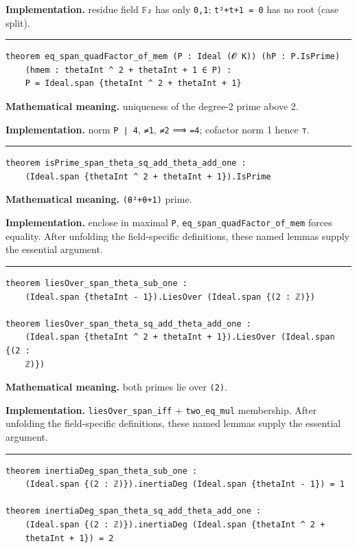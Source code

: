 \documentclass[UTF8,a4paper,11pt,fontset=fandol]{ctexart}
\theoremstyle{definition}
\newcommand{\statementsep}{\par\medskip\hrule\medskip}
\begin{document}
\noindent\textbf{Implementation.} residue field \texttt{𝔽₂} has only \texttt{0,1}; \texttt{t²+t+1 = 0} has no root (case split).\par
\statementsep
\begin{verbatim}
theorem eq_span_quadFactor_of_mem (P : Ideal (𝓞 K)) (hP : P.IsPrime)
    (hmem : thetaInt ^ 2 + thetaInt + 1 ∈ P) :
    P = Ideal.span {thetaInt ^ 2 + thetaInt + 1}
\end{verbatim}
\noindent\textbf{Mathematical meaning.} uniqueness of the degree-2 prime above 2.\par
\noindent\textbf{Implementation.} norm \texttt{P ∣ 4}, \texttt{≠1}, \texttt{≠2} ⟹ \texttt{=4}; cofactor norm 1 hence \texttt{⊤}.\par
\statementsep
\begin{verbatim}
theorem isPrime_span_theta_sq_add_theta_add_one :
    (Ideal.span {thetaInt ^ 2 + thetaInt + 1}).IsPrime
\end{verbatim}
\noindent\textbf{Mathematical meaning.} \texttt{(θ²+θ+1)} prime.\par
\noindent\textbf{Implementation.} enclose in maximal \texttt{P}, \texttt{eq\_\allowbreak{}span\_\allowbreak{}quadFactor\_\allowbreak{}of\_\allowbreak{}mem} forces equality. After unfolding the field-specific definitions, these named lemmas supply the essential argument.\par
\statementsep
\begin{verbatim}
theorem liesOver_span_theta_sub_one :
    (Ideal.span {thetaInt - 1}).LiesOver (Ideal.span {(2 : ℤ)})

theorem liesOver_span_theta_sq_add_theta_add_one :
    (Ideal.span {thetaInt ^ 2 + thetaInt + 1}).LiesOver (Ideal.span {(2 :
    ℤ)})
\end{verbatim}
\noindent\textbf{Mathematical meaning.} both primes lie over \texttt{(2)}.\par
\noindent\textbf{Implementation.} \texttt{liesOver\_\allowbreak{}span\_\allowbreak{}iff} + \texttt{two\_\allowbreak{}eq\_\allowbreak{}mul} membership. After unfolding the field-specific definitions, these named lemmas supply the essential argument.\par
\statementsep
\begin{verbatim}
theorem inertiaDeg_span_theta_sub_one :
    (Ideal.span {(2 : ℤ)}).inertiaDeg (Ideal.span {thetaInt - 1}) = 1

theorem inertiaDeg_span_theta_sq_add_theta_add_one :
    (Ideal.span {(2 : ℤ)}).inertiaDeg (Ideal.span {thetaInt ^ 2 +
    thetaInt + 1}) = 2
\end{verbatim}
\end{document}
